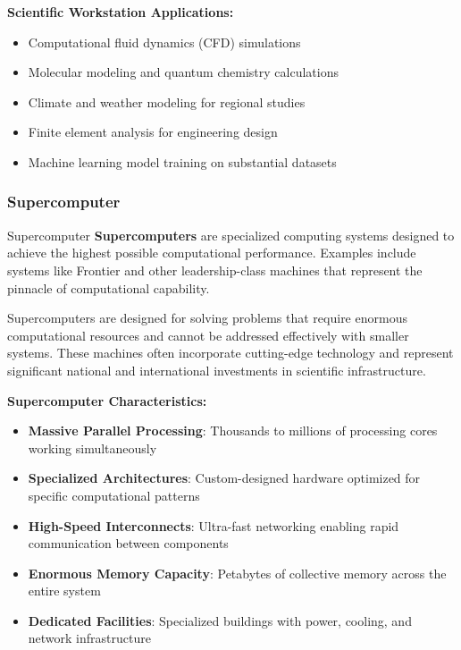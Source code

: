 \textbf{Scientific Workstation Applications:}
\begin{itemize}
    \item Computational fluid dynamics (CFD) simulations
    \item Molecular modeling and quantum chemistry calculations
    \item Climate and weather modeling for regional studies
    \item Finite element analysis for engineering design
    \item Machine learning model training on substantial datasets
\end{itemize}

\subsubsection{Supercomputer}

\begin{conceptcard}{Supercomputer}
\textbf{Supercomputers} are specialized computing systems designed to achieve the highest possible computational performance. Examples include systems like Frontier and other leadership-class machines that represent the pinnacle of computational capability.
\end{conceptcard}

Supercomputers are designed for solving problems that require enormous computational resources and cannot be addressed effectively with smaller systems. These machines often incorporate cutting-edge technology and represent significant national and international investments in scientific infrastructure.

\textbf{Supercomputer Characteristics:}
\begin{itemize}
    \item \textbf{Massive Parallel Processing}: Thousands to millions of processing cores working simultaneously
    \item \textbf{Specialized Architectures}: Custom-designed hardware optimized for specific computational patterns
    \item \textbf{High-Speed Interconnects}: Ultra-fast networking enabling rapid communication between components
    \item \textbf{Enormous Memory Capacity}: Petabytes of collective memory across the entire system
    \item \textbf{Dedicated Facilities}: Specialized buildings with power, cooling, and network infrastructure
\end{itemize}

